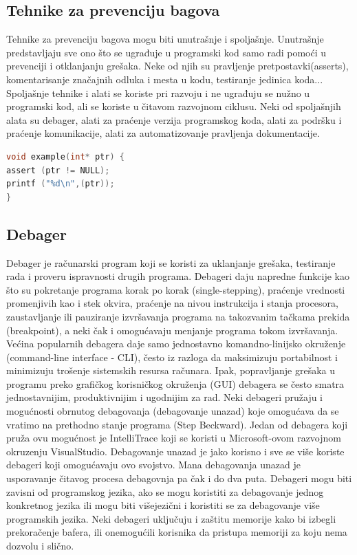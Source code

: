 \documentclass[a4paper]{article}
\begin{document}
\subsection{Tehnike za prevenciju bagova}
\label{subsec:Tehnike za prevenciju bagova}

Tehnike za prevenciju bagova mogu biti unutrašnje i spoljašnje. Unutrašnje predstavljaju sve ono što se ugrađuje u programski kod samo radi pomoći u prevenciji i otklanjanju grešaka. Neke od njih su pravljenje pretpostavki(asserts), komentarisanje značajnih odluka i mesta u kodu, testiranje jedinica koda... Spoljašnje tehnike i alati se koriste pri razvoju i ne ugrađuju se nužno u programski kod, ali se koriste u čitavom razvojnom ciklusu. Neki od spoljašnjih alata su debager, alati za praćenje verzija programskog koda, alati za podršku i praćenje komunikacije, alati za automatizovanje pravljenja dokumentacije\cite{bagovi_smalkov}.
\\

\begin{lstlisting}[language=C,caption=Primer korišćenja assert komande]
void example(int* ptr) {
assert (ptr != NULL);
printf ("%d\n",(ptr));
}
\end{lstlisting}


\subsection{Debager}
\label{subsec:Debager}

Debager je računarski program koji se koristi za uklanjanje grešaka, testiranje rada i proveru ispravnosti drugih programa. Debageri daju napredne funkcije kao što su pokretanje programa korak po korak (single-stepping), praćenje vrednosti promenjivih kao i stek okvira, praćenje na nivou instrukcija i stanja procesora, zaustavljanje ili pauziranje izvršavanja programa na takozvanim tačkama prekida (breakpoint), a neki čak i omogućavaju menjanje programa tokom izvršavanja.\\
\indent Većina popularnih debagera daje samo jednostavno komandno-linijsko okruženje (command-line interface - CLI), često iz razloga da maksimizuju portabilnost i minimizuju trošenje sistemskih resursa računara. Ipak, popravljanje grešaka u programu preko grafičkog korisničkog okruženja (GUI) debagera se često smatra jednostavnijim, produktivnijim i ugodnijim za rad. Neki debageri pružaju i mogućnosti obrnutog debagovanja (debagovanje unazad) koje omogućava da se vratimo na prethodno stanje programa (Step Beckward). Jedan od debagera koji pruža ovu mogućnost je IntelliTrace koji se koristi u Microsoft-ovom razvojnom okruzenju VisualStudio. Debagovanje unazad je jako korisno i sve se više koriste debageri koji omogućavaju ovo svojstvo. Mana debagovanja unazad je usporavanje čitavog procesa debagovnja pa čak i do dva puta. Debageri mogu biti zavisni od programskog jezika, ako se mogu koristiti za debagovanje jednog konkretnog jezika ili mogu biti višejezični i koristiti se za debagovanje više programskih jezika. Neki debageri uključuju i zaštitu memorije kako bi izbegli prekoračenje bafera, ili onemogućili korisnika da pristupa memoriji za koju nema dozvolu i slično.\cite{ssq_debug_def}
\end{document}
